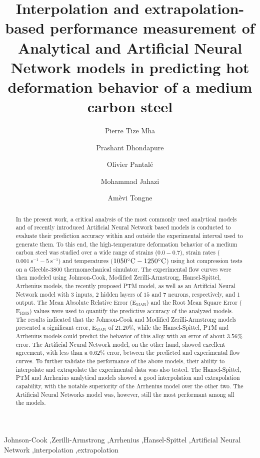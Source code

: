 \documentclass[twoside,english,1p,final,sort&compress]{elsarticle}
\theoremstyle{plain}
\DeclareRobustCommand{\RMSE}{\text{E}_\text{RMS}}
\DeclareRobustCommand{\MARE}{\text{E}_\text{MAR}}
\DeclareRobustCommand{\ps}{\text{s}^{-1}}
\begin{document}
\begin{frontmatter}

\title{Interpolation and extrapolation-based performance measurement of Analytical and Artificial Neural Network models in predicting hot deformation behavior of a medium carbon steel}

\author[LGP]{Pierre Tize Mha}
\author[ETS]{Prashant Dhondapure}
\author[LGP]{Olivier Pantalé}
\author[ETS]{Mohammad Jahazi}
\author[LGP]{Amèvi Tongne}


\address[LGP]{Laboratoire Génie de Production, INP/ENIT, Université de Toulouse, 47 Av d'Azereix, Tarbes, 65016, France}
\address[ETS]{École de technologie supérieure, 1100 Notre Dame St. W., Montreal, QC H3C 1K3, Canada}

\begin{abstract}
In the present work, a critical analysis of the most commonly used analytical models and of recently introduced Artificial Neural Network based models is conducted to evaluate their prediction accuracy within and outside the experimental interval used to generate them.
To this end, the high-temperature deformation behavior of a medium carbon steel was studied over a wide range of strains ($0.0-0.7$), strain rates ($0.001~\ps-5~\ps$) and temperatures ($1050\celsius-1250\celsius$) using hot compression tests on a Gleeble-3800 thermomechanical simulator.
The experimental flow curves were then modeled using Johnson-Cook, Modified Zerilli-Armstrong, Hansel-Spittel, Arrhenius models, the recently proposed PTM model, as well as an Artificial Neural Network model with $3$ inputs, $2$ hidden layers of $15$ and $7$ neurons, respectively, and 1 output.
The Mean Absolute Relative Error ($\MARE$) and the Root Mean Square Error ($\RMSE$) values were used to quantify the predictive accuracy of the analyzed models.
The results indicated that the Johnson-Cook and Modified Zerilli-Armstrong models presented a significant error, $\MARE$ of $21.20\%$, while the Hansel-Spittel, PTM and Arrhenius models could predict the behavior of this alloy with an error of about $3.56\%$ error.
The Artificial Neural Network model, on the other hand, showed excellent agreement, with less than a $0.62\%$ error, between the predicted and experimental flow curves.
To further validate the performance of the above models, their ability to interpolate and extrapolate the experimental data was also tested.
The Hansel-Spittel, PTM and Arrhenius analytical models showed a good interpolation and extrapolation capability, with the notable superiority of the Arrhenius model over the other two.
The Artificial Neural Networks model was, however, still the most performant among all the models.
\end{abstract}

\begin{keyword}
Johnson-Cook \sep Zerilli-Armstrong \sep Arrhenius \sep Hansel-Spittel \sep Artificial Neural Network \sep interpolation \sep extrapolation
\end{keyword}

\end{frontmatter}
\linenumbers
\end{document}
